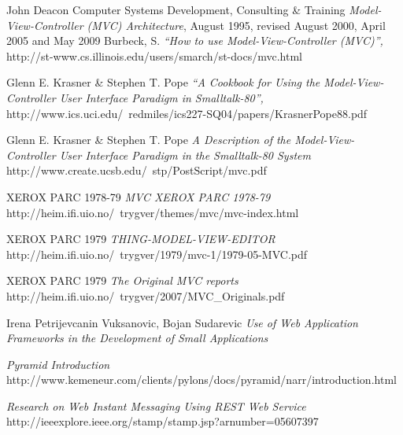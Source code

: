\documentclass[finnish,utf8,nonumbib,palatino,kandi]{gradu2}
\begin{document}
\begin{thebibliography}{9} %
    John Deacon Computer Systems Development, Consulting \& Training
    \emph{Model-View-Controller (MVC) Architecture},
    August 1995, revised August 2000, April 2005 and May 2009
   Burbeck, S.
  \emph{“How to use Model-View-Controller (MVC)”,}
  http://st-www.cs.illinois.edu/users/smarch/st-docs/mvc.html
 
   Glenn E. Krasner \& Stephen T. Pope
  \emph{“A Cookbook for Using the Model-View-Controller User Interface Paradigm in Smalltalk-80”,}
http://www.ics.uci.edu/~redmiles/ics227-SQ04/papers/KrasnerPope88.pdf

   Glenn E. Krasner \& Stephen T. Pope
  \emph{A Description of the Model-View-Controller User Interface Paradigm in the Smalltalk-80 System}
   http://www.create.ucsb.edu/~stp/PostScript/mvc.pdf

  XEROX PARC 1978-79
  \emph{MVC XEROX PARC 1978-79}
http://heim.ifi.uio.no/~trygver/themes/mvc/mvc-index.html

  XEROX PARC 1979
  \emph{THING-MODEL-VIEW-EDITOR}
   http://heim.ifi.uio.no/~trygver/1979/mvc-1/1979-05-MVC.pdf

  XEROX PARC 1979
  \emph{The Original MVC reports}
 http://heim.ifi.uio.no/~trygver/2007/MVC\_Originals.pdf

Irena Petrijevcanin Vuksanovic, Bojan Sudarevic
  \emph{Use of Web Application Frameworks in the Development of Small Applications}


  \emph{Pyramid Introduction}
   http://www.kemeneur.com/clients/pylons/docs/pyramid/narr/introduction.html

\emph{Research on Web Instant Messaging Using REST Web Service}
http://ieeexplore.ieee.org/stamp/stamp.jsp?arnumber=05607397


\end{thebibliography}
\end{document}
